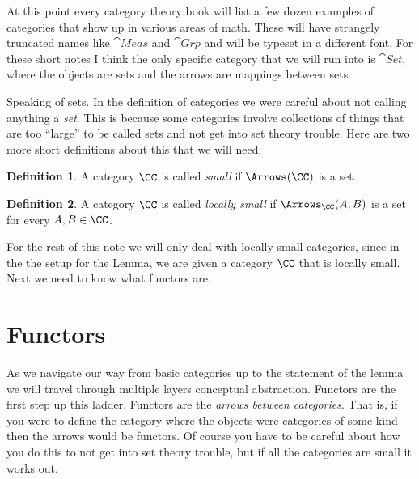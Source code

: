 \documentclass[12pt]{article}
\theoremstyle{definition}
\theoremstyle{definition}
\newtheorem{defn}{Definition}[]
\theoremstyle{definition}
\numberwithin{equation}{section}
\begin{document}
At this point every category theory book will list a few dozen examples of categories that show up in various areas of math. These will have strangely truncated names like $\cat{Meas}$ and $\cat{Grp}$ and will be typeset in a different font. For these short notes I think the only specific category that we will run into is $\cat{Set}$, where the objects are sets and the arrows are mappings between sets.

Speaking of sets. In the definition of categories we were careful about not calling anything a {\it set}. This is because some categories involve collections of things that are too ``large'' to be called sets and not get into set theory trouble. Here are two more short definitions about this that we will need.

\begin{defn}
A category $\CC$ is called {\it small} if $\Arrows(\CC)$ is a set.
\end{defn}

\begin{defn}
A category $\CC$ is called {\it locally small} if $\Arrows_{\CC}(A,B)$ is a set for every $A, B \in \CC$.
\end{defn}%
\noindent
For the rest of this note we will only deal with locally small categories, since in the the setup for the Lemma, we are given a category $\CC$ that is locally small. Next we need to know what functors are.

\section{Functors}

As we navigate our way from basic categories up to the statement of the lemma we will travel through multiple layers conceptual abstraction. Functors are the first step up this ladder. Functors are the {\it arrows between categories}. That is, if you were to define the category where the objects were  categories of some kind then the arrows would be functors. Of course you have to be careful about how you do this to not get into set theory trouble, but if all the categories are small it works out.
\end{document}
